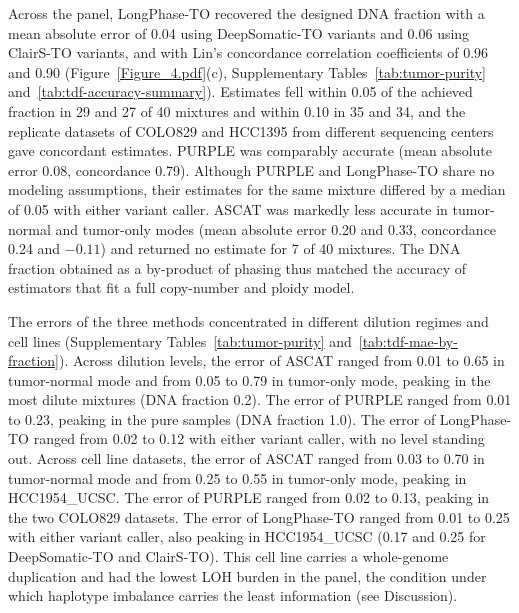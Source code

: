 \documentclass[pdflatex,sn-nature]{sn-jnl}
\begin{document}
Across the panel, LongPhase-TO recovered the designed DNA fraction with a mean absolute error of 0.04 using DeepSomatic-TO variants and 0.06 using ClairS-TO variants, and with Lin's concordance correlation coefficients of 0.96 and 0.90 (Figure~\ref{Figure_4.pdf}(c), Supplementary Tables~\ref{tab:tumor-purity} and~\ref{tab:tdf-accuracy-summary}). Estimates fell within 0.05 of the achieved fraction in 29 and 27 of 40 mixtures and within 0.10 in 35 and 34, and the replicate datasets of COLO829 and HCC1395 from different sequencing centers gave concordant estimates. PURPLE was comparably accurate (mean absolute error 0.08, concordance 0.79). Although PURPLE and LongPhase-TO share no modeling assumptions, their estimates for the same mixture differed by a median of 0.05 with either variant caller. ASCAT was markedly less accurate in tumor-normal and tumor-only modes (mean absolute error 0.20 and 0.33, concordance 0.24 and $-0.11$) and returned no estimate for 7 of 40 mixtures. The DNA fraction obtained as a by-product of phasing thus matched the accuracy of estimators that fit a full copy-number and ploidy model.

The errors of the three methods concentrated in different dilution regimes and cell lines (Supplementary Tables~\ref{tab:tumor-purity} and~\ref{tab:tdf-mae-by-fraction}). Across dilution levels, the error of ASCAT ranged from 0.01 to 0.65 in tumor-normal mode and from 0.05 to 0.79 in tumor-only mode, peaking in the most dilute mixtures (DNA fraction 0.2). The error of PURPLE ranged from 0.01 to 0.23, peaking in the pure samples (DNA fraction 1.0). The error of LongPhase-TO ranged from 0.02 to 0.12 with either variant caller, with no level standing out. Across cell line datasets, the error of ASCAT ranged from 0.03 to 0.70 in tumor-normal mode and from 0.25 to 0.55 in tumor-only mode, peaking in HCC1954\_UCSC. The error of PURPLE ranged from 0.02 to 0.13, peaking in the two COLO829 datasets. The error of LongPhase-TO ranged from 0.01 to 0.25 with either variant caller, also peaking in HCC1954\_UCSC (0.17 and 0.25 for DeepSomatic-TO and ClairS-TO). This cell line carries a whole-genome duplication and had the lowest LOH burden in the panel, the condition under which haplotype imbalance carries the least information (see Discussion).
\end{document}
